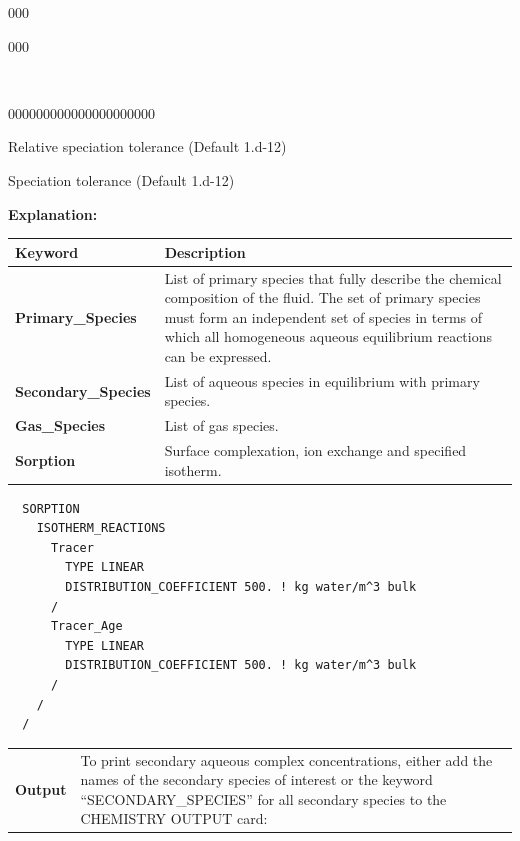 \documentclass[12pt]{article}
\newcommand\keyend{{(., \, /, \, END)}}
\begin{document}
\begin{deflist}{000}
\begin{deflist}{000}
\item [\keyend]

~ 

\end{deflist}
\begin{deflist}{000000000000000000000}
\item[MAX\_RELATIVE\_CHANGE\_TOLERANCE] Relative speciation tolerance (Default 1.d-12)
\item[MAX\_RESIDUAL\_TOLERANCE] Speciation tolerance (Default 1.d-12)
\end{deflist}

\item [\keyend]
\end{deflist}

\noindent
{\bf Explanation:}

\begin{center}
\begin{tabularx}{\linewidth}{lX}
\toprule
\bf Keyword & \bf Description\\
\midrule
\bf Primary\_Species & List of primary species that fully describe the chemical composition of the fluid. The set of primary species must form an independent set of species in terms of which all homogeneous aqueous equilibrium reactions can be expressed.\\
\midrule
\bf Secondary\_Species & List of aqueous species in equilibrium with primary species.\\
\midrule
\bf Gas\_Species & List of gas species.\\
\midrule
\bf Sorption & Surface complexation, ion exchange and specified isotherm.\\
\end{tabularx}
\begin{verbatim}
  SORPTION
    ISOTHERM_REACTIONS
      Tracer
        TYPE LINEAR 
        DISTRIBUTION_COEFFICIENT 500. ! kg water/m^3 bulk
      /
      Tracer_Age
        TYPE LINEAR 
        DISTRIBUTION_COEFFICIENT 500. ! kg water/m^3 bulk
      /
    /
  /
\end{verbatim}
\end{center}

\begin{center}
\begin{tabularx}{\linewidth}{lX}
\midrule
\bf Output &
To print secondary aqueous complex concentrations, either add the names of the secondary species of interest or the keyword ``SECONDARY\_SPECIES'' for all secondary species to the CHEMISTRY OUTPUT card:
\end{tabularx}
\end{center}
\end{document}
